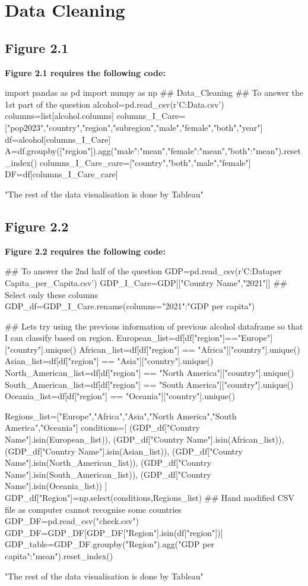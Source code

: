 \appendix
\chapter{Data Cleaning}
\section{Figure 2.1}
\large \textbf{Figure 2.1  requires the following code:}

\vspace{0.5cm}
\begin{python} 
import pandas as pd
import numpy as np
## Data_Cleaning
## To answer the 1st part of the question
alcohol=pd.read_csv(r'C:\Users\Bowen\PycharmProjects\Raw Data\Alcohol\data.csv')
columns=list[alcohol.columns]
columns_I_Care=["pop2023","country","region","subregion","male","female","both","year"]
df=alcohol[columns_I_Care]
A=df.groupby(["region"]).agg({"male":"mean","female":"mean","both":"mean"}).reset_index()
columns_I_Care_care=["country","both","male","female"]
DF=df[columns_I_Care_care]

"The rest of the data visualisation is done by Tableau"
\end{python} 

\pagebreak
\section{Figure 2.2}
\large \textbf{Figure 2.2  requires the following code:}
\begin{python}
    
## To answer the 2nd half of the question
GDP=pd.read_csv(r'C:\Users\Bowen\PycharmProjects\Raw Data\GDP per Capita\GDP_per_Capita.csv')
GDP_I_Care=GDP[["Country Name","2021"]] ## Select only these columns
GDP_df=GDP_I_Care.rename(columns={"2021":"GDP per capita"})

## Lets try using the previous information of previous alcohol dataframe so that I can classify based on region.
European_list=df[df["region"]=="Europe"]["country"].unique()
African_list=df[df["region"] == "Africa"]["country"].unique()
Asian_list=df[df["region"] == "Asia"]["country"].unique()
North_American_list=df[df["region"] == "North America"]["country"].unique()
South_American_list=df[df["region"] == "South America"]["country"].unique()
Oceania_list=df[df["region"] == "Oceania"]["country"].unique()

Regions_list=["Europe","Africa","Asia","North America","South America","Oceania"]
conditions=[
    (GDP_df["Country Name"].isin(European_list)),
    (GDP_df["Country Name"].isin(African_list)),
    (GDP_df["Country Name"].isin(Asian_list)),
    (GDP_df["Country Name"].isin(North_American_list)),
    (GDP_df["Country Name"].isin(South_American_list)),
    (GDP_df["Country Name"].isin(Oceania_list))
]
GDP_df["Region"]=np.select(conditions,Regions_list)
## Hand modified CSV file as computer cannot recognise some countries
GDP_DF=pd.read_csv("check.csv")
GDP_DF=GDP_DF[GDP_DF["Region"].isin(df["region"])]
GDP_table=GDP_DF.groupby("Region").agg({"GDP per capita":"mean"}).reset_index()

"The rest of the data visualisation is done by Tableau"
\end{python}